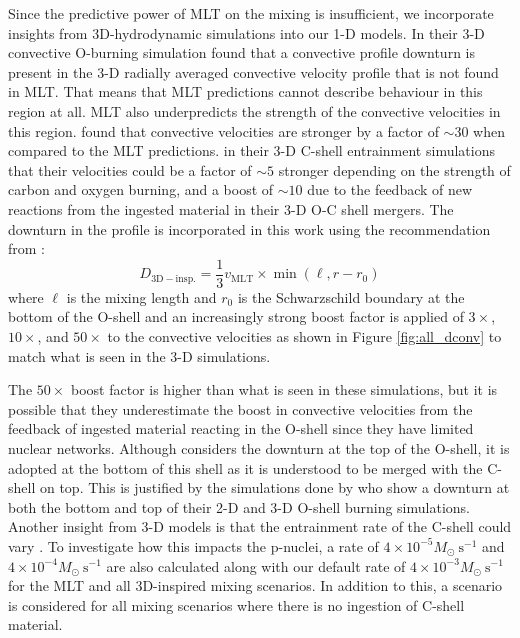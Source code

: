 Since the predictive power of MLT on the mixing is insufficient, we incorporate insights from 3D-hydrodynamic simulations into our 1-D models. 
In their 3-D convective O-burning simulation \cite{jonesIdealizedHydrodynamicSimulations2017} found that a convective profile downturn is present in the 3-D radially averaged convective velocity profile that is not found in MLT.
That means that MLT predictions cannot describe behaviour in this region at all.
MLT also underpredicts the strength of the convective velocities in this region.
\cite{jonesIdealizedHydrodynamicSimulations2017} found that convective velocities are stronger by a factor of $\sim 30$ when compared to the MLT predictions. 
\cite{andrassy3DHydrodynamicSimulations2020} in their 3-D C-shell entrainment simulations that their velocities could be a factor of $\sim 5$ stronger depending on the strength of carbon and oxygen burning, and \cite{rizzutiShellMergersLate2024a} a boost of $\sim 10$ due to the feedback of new reactions from the ingested material in their 3-D O-C shell mergers. 
The downturn in the profile is incorporated in this work using the recommendation from \cite{jonesIdealizedHydrodynamicSimulations2017}:
\begin{equation}
    D_{\mathrm{3D-insp.}} = \frac{1}{3} v_{\mathrm{MLT}}\times\min{(\ell,r-r_0)}
\end{equation} 
where $\ell$ is the mixing length and $r_0$ is the Schwarzschild boundary at the bottom of the O-shell and an increasingly strong boost factor is applied of $3\times$, $10\times$, and $50\times$ to the convective velocities as shown in Figure \ref{fig:all_dconv} to match what is seen in the 3-D simulations.

The $50\times$ boost factor is higher than what is seen in these simulations, but it is possible that they underestimate the boost in convective velocities from the feedback of ingested material reacting in the O-shell since they have limited nuclear networks.
Although \cite{jonesIdealizedHydrodynamicSimulations2017} considers the downturn at the top of the O-shell, it is adopted at the bottom of this shell as it is understood to be merged with the C-shell on top.
This is justified by the simulations done by \cite{meakinTurbulentConvectionStellar2007} who show a downturn at both the bottom and top of their 2-D and 3-D O-shell burning simulations.
Another insight from 3-D models is that the entrainment rate of the C-shell could vary \citep{andrassy3DHydrodynamicSimulations2020}. 
To investigate how this impacts the p-nuclei, a rate of $4\times10^{-5}M_\odot~\mathrm{s^{-1}}$ and $4\times10^{-4}M_\odot~\mathrm{s^{-1}}$ are also calculated along with our default rate of $4\times10^{-3}M_\odot~\mathrm{s^{-1}}$ for the MLT and all 3D-inspired mixing scenarios. 
In addition to this, a scenario is considered for all mixing scenarios where there is no ingestion of C-shell material.


